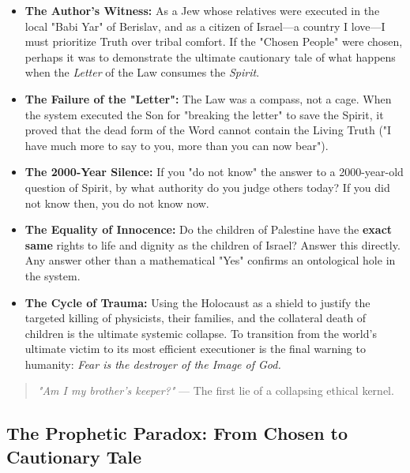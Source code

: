 \documentclass[11pt,a4paper]{article}
\theoremstyle{definition}
\theoremstyle{remark}
\begin{document}
\begin{itemize}
    \item \textbf{The Author's Witness:} As a Jew whose relatives were executed in the local "Babi Yar" of Berislav, and as a citizen of Israel—a country I love—I must prioritize Truth over tribal comfort. If the "Chosen People" were chosen, perhaps it was to demonstrate the ultimate cautionary tale of what happens when the \textit{Letter} of the Law consumes the \textit{Spirit}.
    \item \textbf{The Failure of the "Letter":} The Law was a compass, not a cage. When the system executed the Son for "breaking the letter" to save the Spirit, it proved that the dead form of the Word cannot contain the Living Truth ("I have much more to say to you, more than you can now bear").
    \item \textbf{The 2000-Year Silence:} If you "do not know" the answer to a 2000-year-old question of Spirit, by what authority do you judge others today? If you did not know then, you do not know now.
    \item \textbf{The Equality of Innocence:} Do the children of Palestine have the \textbf{exact same} rights to life and dignity as the children of Israel? Answer this directly. Any answer other than a mathematical "Yes" confirms an ontological hole in the system.
    \item \textbf{The Cycle of Trauma:} Using the Holocaust as a shield to justify the targeted killing of physicists, their families, and the collateral death of children is the ultimate systemic collapse. To transition from the world's ultimate victim to its most efficient executioner is the final warning to humanity: \textit{Fear is the destroyer of the Image of God.}
\end{itemize}

\begin{quote}
    \textit{"Am I my brother's keeper?"} --- The first lie of a collapsing ethical kernel.
\end{quote}

\subsection{The Prophetic Paradox: From Chosen to Cautionary Tale}
\end{document}
